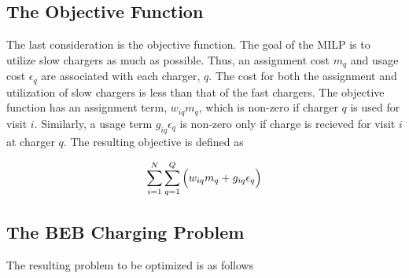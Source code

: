 \documentclass[letterpaper, 10pt, conference]{IEEEtran}
\begin{document}
\subsection{The Objective Function}
The last consideration is the objective function. The goal of the MILP is to utilize slow chargers as much as possible. Thus, an assignment cost $m_q$ and usage cost $\epsilon_q$ are associated with each charger, $q$. The cost for both the assignment and utilization of slow chargers is less than that of the fast chargers. The objective function has an assignment term, $w_{iq}m_q$, which is non-zero if charger $q$ is used for visit $i$. Similarly, a usage term $g_{iq} \epsilon_q$ is non-zero only if charge is recieved for visit $i$ at charger $q$. The resulting objective is defined as

\begin{equation}
\label{eq:objective}
	\sum_{i=1}^N \sum_{q=1}^Q \Big( w_{iq} m_q + g_{iq} \epsilon_q \Big) \\
\end{equation}

\subsection{The BEB Charging Problem}
The resulting problem to be optimized is as follows
\end{document}
